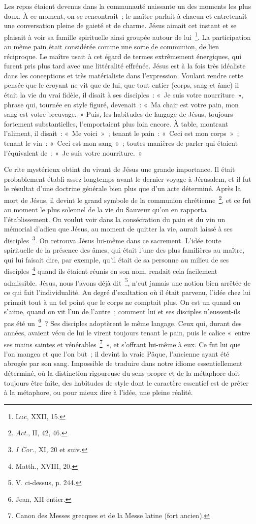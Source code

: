 \documentclass[french,twoside]{book} %
\begin{document}
Les repas étaient devenus dans la communauté naissante un des moments les plus doux. À ce moment, on se rencontrait ; le maître parlait à chacun et entretenait une conversation pleine de gaieté et de charme. Jésus aimait cet instant et se plaisait à voir sa famille spirituelle ainsi groupée autour de lui \footnote{Luc, XXII, 15.}. La participation au même pain était considérée comme une sorte de communion, de lien réciproque. Le maître usait à cet égard de termes extrêmement énergiques, qui furent pris plus tard avec une littéralité effrénée. Jésus est à la fois très idéaliste dans les conceptions et très matérialiste dans l’expression. Voulant rendre cette pensée que le croyant ne vit que de lui, que tout entier (corps, sang et âme) il était la vie du vrai fidèle, il disait à ses disciples : « Je suis votre nourriture », phrase qui, tournée en style figuré, devenait : « Ma chair est votre pain, mon sang est votre breuvage. » Puis, les habitudes de langage de Jésus, toujours fortement substantielles, l’emportaient plus loin encore. À table, montrant l’aliment, il disait : « Me voici » ; tenant le pain : « Ceci est mon corps » ; tenant le vin : « Ceci est mon sang » ; toutes manières de parler qui étaient l’équivalent de : « Je suis votre nourriture. »\par
Ce rite mystérieux obtint du vivant de Jésus une grande importance. Il était probablement établi assez longtemps avant le dernier voyage à Jérusalem, et il fut le résultat d’une doctrine générale bien plus que d’un acte déterminé. Après la mort de Jésus, il devint le grand symbole de la communion chrétienne \footnote{{\itshape Act.}, II, 42, 46.}, et ce fut au moment le plus solennel de la vie du Sauveur qu’on en rapporta l’établissement. On voulut voir dans la consécration du pain et du vin un mémorial d’adieu que Jésus, au moment de quitter la vie, aurait laissé à ses disciples \footnote{{\itshape I Cor.}, XI, 20 et suiv.}. On retrouva Jésus lui-même dans ce sacrement. L’idée toute spirituelle de la présence des âmes, qui était l’une des plus familières au maître, qui lui faisait dire, par exemple, qu’il était de sa personne au milieu de ses disciples \footnote{Matth., XVIII, 20.} quand ils étaient réunis en son nom, rendait cela facilement admissible. Jésus, nous l’avons déjà dit \footnote{V. ci-dessus, p. 244.}, n’eut jamais une notion bien arrêtée de ce qui fait l’individualité. Au degré d’exaltation où il était parvenu, l’idée chez lui primait tout à un tel point que le corps ne comptait plus. On est un quand on s’aime, quand on vit l’un de l’autre ; comment lui et ses disciples n’eussent-ils pas été un \footnote{Jean, XII entier.} ? Ses disciples adoptèrent le même langage. Ceux qui, durant des années, avaient vécu de lui le virent toujours tenant le pain, puis le calice « entre ses mains saintes et vénérables \footnote{Canon des Messes grecques et de la Messe latine (fort ancien).} », et s’offrant lui-même à eux. Ce fut lui que l’on mangea et que l’on but ; il devint la vraie Pâque, l’ancienne ayant été abrogée par son sang. Impossible de traduire dans notre idiome essentiellement déterminé, où la distinction rigoureuse du sens propre et de la métaphore doit toujours être faite, des habitudes de style dont le caractère essentiel est de prêter à la métaphore, ou pour mieux dire à l’idée, une pleine réalité.
\end{document}
